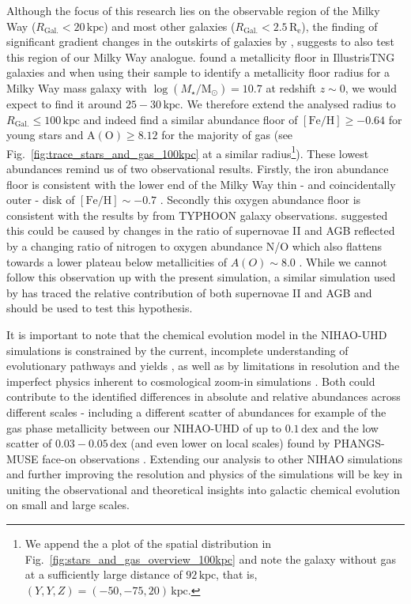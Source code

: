 \documentclass[fleqn,usenatbib]{mnras}
\begin{document}
Although the focus of this research lies on the observable region of the Milky Way ($R_\mathrm{Gal.} < 20\,\mathrm{kpc}$) and most other galaxies ($R_\mathrm{Gal.} < 2.5\,\mathrm{R_e}$), the finding of significant gradient changes in the outskirts of galaxies by \citet{Garcia2023}, suggests to also test this region of our Milky Way analogue. \citet[][see their Fig.~4]{Garcia2023} found a metallicity floor in IllustrisTNG galaxies and when using their sample to identify a metallicity floor radius for a Milky Way mass galaxy with $\log(M_\star/\mathrm{M_\odot}) = 10.7$ \citep{BlandHawthorn_Gerhard2016} at redshift $z \sim 0$, we would expect to find it around $25-30\,\mathrm{kpc}$. We therefore extend the analysed radius to $R_\mathrm{Gal.} \leq 100\,\mathrm{kpc}$ and indeed find a similar abundance floor of $\mathrm{[Fe/H]} \geq -0.64$ for young stars and $\mathrm{A(O)} \geq 8.12$ for the majority of gas (see Fig.~\ref{fig:trace_stars_and_gas_100kpc} at a similar radius\footnote{We append the a plot of the spatial distribution in Fig.~\ref{fig:stars_and_gas_overview_100kpc} and note the galaxy without gas at a sufficiently large distance of $92\,\mathrm{kpc}$, that is, $(Y,Y,Z) = (-50,-75,20)\,\mathrm{kpc}$.}). These lowest abundances remind us of two observational results. Firstly, the iron abundance floor is consistent with the lower end of the Milky Way thin - and coincidentally outer - disk of $\mathrm{[Fe/H]} \sim -0.7$ \citep{Bensby2014, Buder2019}. Secondly this oxygen abundance floor is consistent with the results by \citet{Grasha2022} from TYPHOON galaxy observations. \citet{Grasha2022} suggested this could be caused by changes in the ratio of supernovae II and AGB reflected by a changing ratio of nitrogen to oxygen abundance N/O which also flattens towards a lower plateau below metallicities of $A(O) \sim 8.0$ \citep{Nicholls2017}. While we cannot follow this observation up with the present simulation, a similar simulation used by \citet{Buder2024} has traced the relative contribution of both supernovae II and AGB and should be used to test this hypothesis.

It is important to note that the chemical evolution model in the NIHAO-UHD simulations is constrained by the current, incomplete understanding of evolutionary pathways and yields \citep{Buck2021}, as well as by limitations in resolution and the imperfect physics inherent to cosmological zoom-in simulations \citep{Buck2020}.
Both could contribute to the identified differences in absolute and relative abundances across different scales - including a different scatter of abundances for example of the gas phase metallicity between our NIHAO-UHD of up to $0.1\,\mathrm{dex}$ and the low scatter of $0.03-0.05\,\mathrm{dex}$ (and even lower on local scales) found by PHANGS-MUSE face-on observations \citep{Kreckel2020}. Extending our analysis to other NIHAO simulations and further improving the resolution and physics of the simulations will be key in uniting the observational and theoretical insights into galactic chemical evolution on small and large scales.
\end{document}
